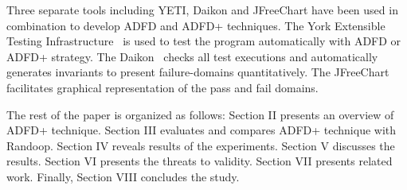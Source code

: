 \documentclass[runningheads,a4paper]{llncs}
\begin{document}
Three separate tools including YETI, Daikon and JFreeChart have been used in combination to develop ADFD and ADFD+ techniques. The York Extensible Testing Infrastructure~\cite{Oriol2011yeti} is used to test the program automatically with ADFD or ADFD+ strategy. The Daikon~\cite{ernst2007daikon} checks all test executions and automatically generates invariants to present failure-domains quantitatively. The JFreeChart~\cite{gilbert2008jfreechart} facilitates graphical representation of the pass and fail domains.




The rest of the paper is organized as follows: Section II presents an overview of ADFD+ technique. Section III evaluates and compares ADFD+ technique with Randoop. Section IV reveals results of the experiments. Section V discusses the results. Section VI presents the threats to validity. Section VII presents related work. Finally, Section VIII concludes the study.


 



\end{document}

